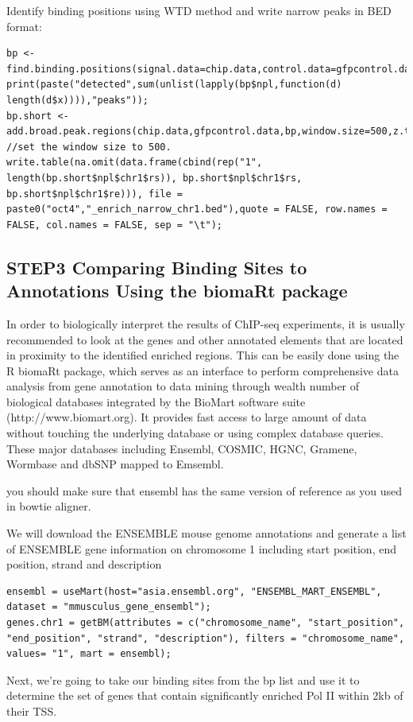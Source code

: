 \begin{steps}
Identify binding positions using WTD method and write narrow peaks in BED format:
\begin{lstlisting}
bp <- find.binding.positions(signal.data=chip.data,control.data=gfpcontrol.data,fdr=fdr,whs=detection.window.halfsize);
print(paste("detected",sum(unlist(lapply(bp$npl,function(d) length(d$x)))),"peaks"));
bp.short <- add.broad.peak.regions(chip.data,gfpcontrol.data,bp,window.size=500,z.thr=3); //set the window size to 500. 
write.table(na.omit(data.frame(cbind(rep("1", length(bp.short$npl$chr1$rs)), bp.short$npl$chr1$rs, bp.short$npl$chr1$re))), file = paste0("oct4","_enrich_narrow_chr1.bed"),quote = FALSE, row.names = FALSE, col.names = FALSE, sep = "\t");  
\end{lstlisting} 
\end{steps}


\subsection{STEP3 Comparing Binding Sites to Annotations Using the biomaRt package} 
In order to biologically interpret the results of ChIP-seq experiments, it is usually recommended to look at the genes and other annotated elements that are located in proximity to the identified enriched regions. This can be easily done using the R biomaRt package, which serves as an interface to perform comprehensive data analysis from gene annotation to data mining  through wealth number of biological databases integrated by the BioMart software suite (http://www.biomart.org). It provides fast access to large amount of data without touching the underlying database or using complex database queries. These major databases including Ensembl, COSMIC, HGNC, Gramene, Wormbase and dbSNP mapped to Emsembl.

\begin{warning} you should make sure that ensembl has the same version of reference as you used in bowtie aligner. 
\end{warning}
\begin{steps}
We will download the ENSEMBLE mouse genome annotations and generate a list of ENSEMBLE gene information on chromosome 1 including start position, end position, strand and description
\begin{lstlisting}
ensembl = useMart(host="asia.ensembl.org", "ENSEMBL_MART_ENSEMBL", dataset = "mmusculus_gene_ensembl");
genes.chr1 = getBM(attributes = c("chromosome_name", "start_position", "end_position", "strand", "description"), filters = "chromosome_name", values= "1", mart = ensembl);
\end{lstlisting}
Next, we're going to take our binding sites from the bp list and use it to determine the set of genes that contain significantly enriched Pol II within 2kb of their TSS. 
\end{steps}

